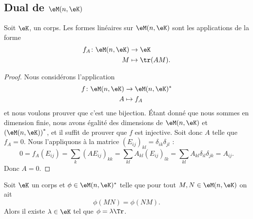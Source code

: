 \subsection{Dual de \texorpdfstring{$ \eM(n,\eK)$}{M(n,K)}}

\begin{proposition}     \label{PropHOjJpCa}
    Soit \( \eK\), un corps. Les formes linéaires sur \( \eM(n,\eK)\) sont les applications de la forme
    \begin{equation}
        \begin{aligned}
            f_A\colon \eM(n,\eK)&\to \eK \\
            M&\mapsto \tr(AM).
        \end{aligned}
    \end{equation}
\end{proposition}


\begin{proof}
    Nous considérons l'application
    \begin{equation}
        \begin{aligned}
            f\colon \eM(n,\eK)&\to \eM(n,\eK)^* \\
            A&\mapsto f_A
        \end{aligned}
    \end{equation}
    et nous voulons prouver que c'est une bijection. Étant donné que nous sommes en dimension finie, nous avons égalité des dimensions de \( \eM(n,\eK)\) et \( \left(\eM(n,\eK)\right)^*\), et il suffit de prouver que \( f\) est injective. Soit donc \( A\) telle que \( f_A=0\). Nous l'appliquons à la matrice \( (E_{ij})_{kl}=\delta_{ik}\delta_{jl}\) :
    \begin{equation}
            0=f_A(E_{ij})
            =\sum_{k}(AE_{ij})_{kk}
            =\sum_{kl}A_{kl}(E_{ij})_{lk}
            =\sum_{kl}A_{kl}\delta_{il}\delta_{jk}
            =A_{ij}.
    \end{equation}
    Donc \( A=0\).
\end{proof}

\begin{corollary}
    Soit \( \eK\) un corps et \( \phi\in\eM(n,\eK)^*\) telle que pour tout \( M,N\in \eM(n,\eK)\) on ait
    \begin{equation}
        \phi(MN)=\phi(NM).
    \end{equation}
    Alors il existe \( \lambda\in \eK\) tel que \( \phi=\lambda\Tr\).
\end{corollary}

